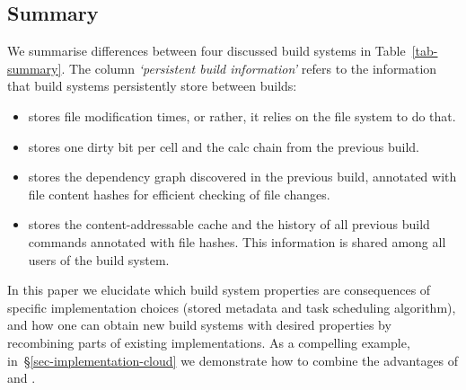 \vspace{-1.5mm}
\subsection{Summary}\label{sec-background-summary}
\vspace{-0.5mm}

We summarise differences between four discussed build systems in
Table~\ref{tab-summary}. The column \emph{`persistent build information'} refers
to the information that build systems persistently store between builds:
\begin{itemize}
    \item \Make stores file modification times, or rather, it relies on the file
    system to do that.
    \item \Excel stores one dirty bit per cell and the calc chain from the
    previous build.
    \item \Shake stores the dependency graph discovered in the previous build,
    annotated with file content hashes for efficient checking of file changes.
    \item \Bazel stores the content-addressable cache and the history of all
    previous build commands annotated with file hashes. This information is
    shared among all users of the build system.
\end{itemize}

In this paper we elucidate which build system properties are consequences of
specific implementation choices (stored metadata and task scheduling algorithm),
and how one can obtain new build systems with desired properties by recombining
parts of existing implementations. As a compelling example,
in~\S\ref{sec-implementation-cloud} we demonstrate how to combine the advantages
of \Shake and \Bazel.
